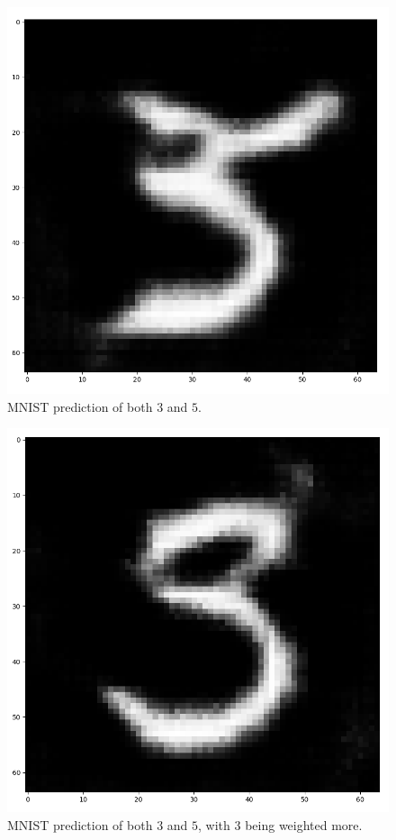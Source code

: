 \documentclass[10pt,twocolumn,letterpaper]{article}
\begin{document}
\begin{figure}
   \centering
   \includegraphics[scale=0.39]{images/gen35.png}
   \caption{MNIST prediction of both $3$ and $5$.}
   \label{fig:mnist-35}
\end{figure}

\begin{figure}
   \centering
   \includegraphics[scale=0.39]{images/gen35with3weighted.png}
   \caption{MNIST prediction of both $3$ and $5$, with $3$ being weighted more.}
   \label{fig:mnist-3w5}
\end{figure}
\end{document}
